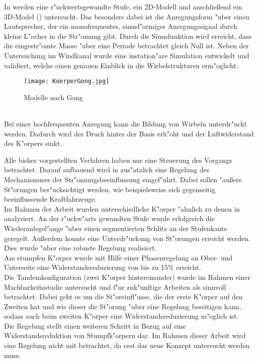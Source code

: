 In \cite{Gong.2015} werden eine r"uckwertsgewandte Stufe, ein 2D-Modell und anschlie\ss{}end ein 3D-Model () untersucht. Das besondere dabei ist die Anregungsform "uber einen Lautsprecher, der ein monofrequentes, sinusf"ormiges Anregungssignal durch kleine L"ocher in die Str"omung gibt. Durch die Sinusfunktion wird erreicht, dass die eingestr"omte Masse "uber eine Periode betrachtet gleich Null ist. Neben der Untersuchung im Windkanal wurde eine instation"are Simulation entwickelt und validiert, welche einen genauen Einblick in die Wirbelstrukturen erm"oglicht.
\begin{figure}[h]
	\centering
	\texttt{[image: KoerperGong.jpg]}
	\caption{Modelle nach Gong \cite{Gong.2015}}
	\label{fig:Gong}
\end{figure}\\
Bei einer hochfrequenten Anregung kann die Bildung von Wirbeln unterdr"uckt werden. Dadurch wird der Druck hinter der Basis erh"oht und der Luftwiderstand des K"orpers sinkt.

Alle bisher vorgestellten Verfahren haben nur eine Steuerung des Vorgangs betrachtet. Darauf aufbauend wird in \cite{Henning.2008} zus"atzlich eine Regelung des Mechanismuses der Str"omungsbeeinflussung eingef"uhrt. Dabei sollen "au\ss{}ere St"orungen ber"ucksichtigt werden, wie beispielsweise sich gegenseitig beeinflussende Kraftfahrzeuge.\\
Im Rahmen der Arbeit \cite{Henning.2008} wurden unterschiedliche K"orper "ahnlich zu denen in  analysiert.
An der r"uckw"arts gewandten Stufe wurde erfolgreich die Wiederanlegel"ange "uber einen segmentierten Schlitz an der Stufenkante geregelt. Au\ss{}erdem konnte eine Unterdr"uckung von St"orungen erreicht werden. Dies wurde "uber eine robuste Regelung realisiert.\\
Am stumpfen K"orper wurde mit Hilfe einer Phasenregelung an Ober- und Unterseite eine Widerstandsreduzierung von bis zu 15\% erreicht.\\
Die Tandemkonfiguration (zwei K"orper hintereinander) wurde im Rahmen einer Machbarkeitsstudie \cite{Henning.2008} untersucht und f"ur zuk"unftige Arbeiten als sinnvoll betrachtet. Dabei geht es um die St"oreinfl"usse, die der erste K"orper auf den Zweiten hat und wie dieser die St"orung "uber eine Regelung beseitigen kann, sodass auch beim zweiten K"orper eine Widerstandsreduzierung m"oglich ist.\\
Die Regelung stellt einen weiteren Schritt in Bezug auf eine Widerstandsreduktion von Stumpfk"orpern dar. Im Rahmen dieser Arbeit wird eine Regelung nicht mit betrachtet, da erst das neue Konzept untersucht werden muss.
